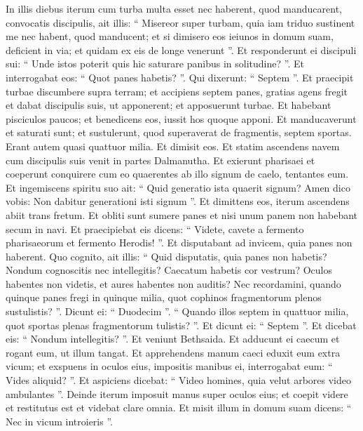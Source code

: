 \begin{biblechapter}
\begin{biblechapter}
\begin{biblechapter}
\begin{biblechapter}
\begin{biblechapter}
\begin{biblechapter}
\begin{biblechapter}
\begin{biblechapter}
\verse In illis diebus iterum cum turba multa esset nec haberent, quod manducarent, convocatis discipulis, ait illis: 
\verse “ Misereor super turbam, quia iam triduo sustinent me nec habent, quod manducent; 
\verse et si dimisero eos ieiunos in domum suam, deficient in via; et quidam ex eis de longe venerunt ”. 
\verse Et responderunt ei discipuli sui: “ Unde istos poterit quis hic saturare panibus in solitudine? ”. 
\verse Et interrogabat eos: “ Quot panes habetis? ”. Qui dixerunt: “ Septem ”. 
\verse Et praecipit turbae discumbere supra terram; et accipiens septem panes, gratias agens fregit et dabat discipulis suis, ut apponerent; et apposuerunt turbae. 
\verse Et habebant pisciculos paucos; et benedicens eos, iussit hos quoque apponi. 
\verse Et manducaverunt et saturati sunt; et sustulerunt, quod superaverat de fragmentis, septem sportas. 
\verse Erant autem quasi quattuor milia. Et dimisit eos.
 \verse Et statim ascendens navem cum discipulis suis venit in partes Dalmanutha. 
 \verse Et exierunt pharisaei et coeperunt conquirere cum eo quaerentes ab illo signum de caelo, tentantes eum. 
\verse Et ingemiscens spiritu suo ait: “ Quid generatio ista quaerit signum? Amen dico vobis: Non dabitur generationi isti signum ”. 
\verse Et dimittens eos, iterum ascendens abiit trans fretum.
 \verse Et obliti sunt sumere panes et nisi unum panem non habebant secum in navi. 
 \verse Et praecipiebat eis dicens: “ Videte, cavete a fermento pharisaeorum et fermento Herodis! ”. 
\verse Et disputabant ad invicem, quia panes non haberent. 
 \verse Quo cognito, ait illis: “ Quid disputatis, quia panes non habetis? Nondum cognoscitis nec intellegitis? Caecatum habetis cor vestrum? 
\verse Oculos habentes non videtis, et aures habentes non auditis? Nec recordamini, 
\verse quando quinque panes fregi in quinque milia, quot cophinos fragmentorum plenos sustulistis? ”. Dicunt ei: “ Duodecim ”. 
\verse “ Quando illos septem in quattuor milia, quot sportas plenas fragmentorum tulistis? ”. Et dicunt ei: “ Septem ”. 
\verse Et dicebat eis: “ Nondum intellegitis? ”.
 \verse Et veniunt Bethsaida. Et adducunt ei caecum et rogant eum, ut illum tangat. 
\verse Et apprehendens manum caeci eduxit eum extra vicum; et exspuens in oculos eius, impositis manibus ei, interrogabat eum: “ Vides aliquid? ”. 
\verse Et aspiciens dicebat: “ Video homines, quia velut arbores video ambulantes ”. 
\verse Deinde iterum imposuit manus super oculos eius; et coepit videre et restitutus est et videbat clare omnia. 
\verse Et misit illum in domum suam dicens: “ Nec in vicum introieris ”.

\end{biblechapter}
\end{biblechapter}
\end{biblechapter}
\end{biblechapter}
\end{biblechapter}
\end{biblechapter}
\end{biblechapter}
\end{biblechapter}
